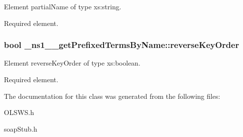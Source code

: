 Element partialName of type xs:string. 

Required element. \hypertarget{class__ns1____getPrefixedTermsByName_a3c050dd7de247ad1287009ee8c45124c}{
\subsubsection[{reverseKeyOrder}]{\setlength{\rightskip}{0pt plus 5cm}bool {\bf \_\-ns1\_\-\_\-getPrefixedTermsByName::reverseKeyOrder}}}
\label{class__ns1____getPrefixedTermsByName_a3c050dd7de247ad1287009ee8c45124c}


Element reverseKeyOrder of type xs:boolean. 

Required element. 

The documentation for this class was generated from the following files:\begin{DoxyCompactItemize}
\item 
OLSWS.h\item 
soapStub.h\end{DoxyCompactItemize}
